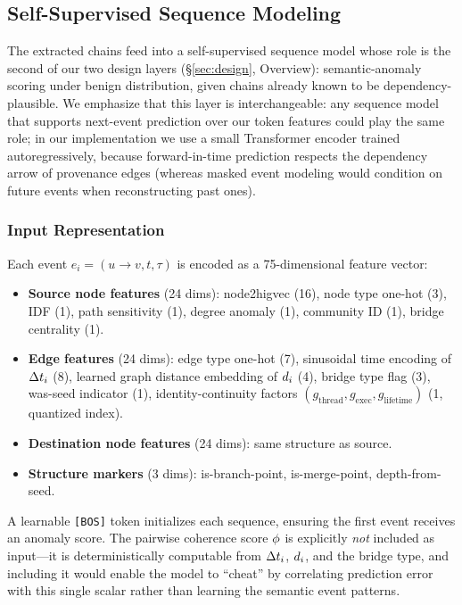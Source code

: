 \subsection{Self-Supervised Sequence Modeling}
\label{sec:seq_model}

The extracted chains feed into a self-supervised sequence model whose role is the second of our two design layers (\S\ref{sec:design}, Overview): semantic-anomaly scoring under benign distribution, given chains already known to be dependency-plausible. We emphasize that this layer is interchangeable: any sequence model that supports next-event prediction over our token features could play the same role; in our implementation we use a small Transformer encoder trained autoregressively, because forward-in-time prediction respects the dependency arrow of provenance edges (whereas masked event modeling would condition on future events when reconstructing past ones).

\subsubsection{Input Representation}

Each event $e_i = (u \rightarrow v, t, \tau)$ is encoded as a 75-dimensional feature vector:

\begin{itemize}
\item \textbf{Source node features} (24 dims): node2higvec (16), node type one-hot (3), IDF (1), path sensitivity (1), degree anomaly (1), community ID (1), bridge centrality (1).
\item \textbf{Edge features} (24 dims): edge type one-hot (7), sinusoidal time encoding of $\Delta t_i$ (8), learned graph distance embedding of $d_i$ (4), bridge type flag (3), was-seed indicator (1), identity-continuity factors $(g_{\text{thread}}, g_{\text{exec}}, g_{\text{lifetime}})$ (1, quantized index).
\item \textbf{Destination node features} (24 dims): same structure as source.
\item \textbf{Structure markers} (3 dims): is-branch-point, is-merge-point, depth-from-seed.
\end{itemize}

A learnable \texttt{[BOS]} token initializes each sequence, ensuring the first event receives an anomaly score. The pairwise coherence score $\phi$ is explicitly \emph{not} included as input---it is deterministically computable from $\Delta t_i$, $d_i$, and the bridge type, and including it would enable the model to ``cheat'' by correlating prediction error with this single scalar rather than learning the semantic event patterns.


